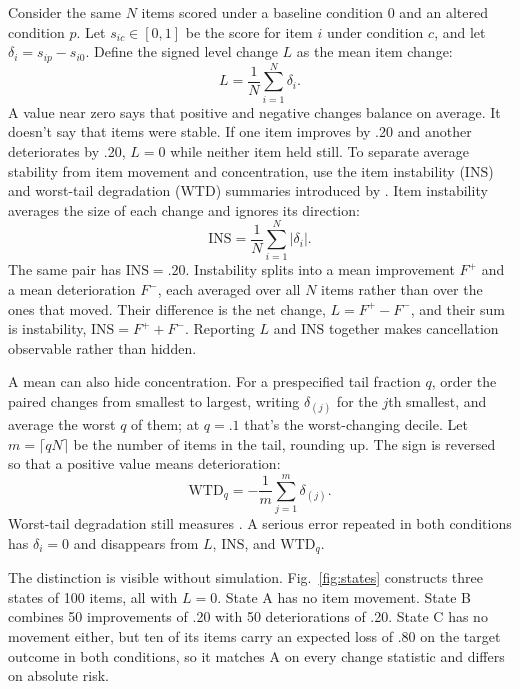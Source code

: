 \documentclass[12pt]{article}
\newcommand{\instab}{\mathrm{INS}}
\newcommand{\wtd}{\mathrm{WTD}}
\begin{document}
Consider the same \(N\) items scored under a baseline condition \(0\) and an altered condition \(p\). Let \(s_{ic}\in[0,1]\) be the score for item \(i\) under condition \(c\), and let \(\delta_i=s_{ip}-s_{i0}\). Define the signed level change \(L\) as the mean item change:
\begin{equation}\label{eq:signed_change}
L=\frac{1}{N}\sum_{i=1}^{N}\delta_i.
\end{equation}
A value near zero says that positive and negative changes balance on average. It doesn't say that items were stable. If one item improves by .20 and another deteriorates by .20, \(L=0\) while neither item held still. To separate average stability from item movement and concentration, use the item instability (\(\instab\)) and worst-tail degradation (\(\wtd\)) summaries introduced by \textcite{zhang2026illusionRobustness}. Item instability averages the size of each change and ignores its direction:
\begin{equation}\label{eq:instability}
\instab=\frac{1}{N}\sum_{i=1}^{N}|\delta_i|.
\end{equation}
The same pair has \(\instab=.20\). Instability splits into a mean improvement \(F^+\) and a mean deterioration \(F^-\), each averaged over all \(N\) items rather than over the ones that moved. Their difference is the net change, \(L=F^+-F^-\), and their sum is instability, \(\instab=F^++F^-\). Reporting \(L\) and \(\instab\) together makes cancellation observable rather than hidden.

A mean can also hide concentration. For a prespecified tail fraction \(q\), order the paired changes from smallest to largest, writing \(\delta_{(j)}\) for the \(j\)th smallest, and average the worst \(q\) of them; at \(q=.1\) that's the worst-changing decile. Let \(m=\lceil qN\rceil\) be the number of items in the tail, rounding up. The sign is reversed so that a positive value means deterioration:
\begin{equation}\label{eq:wtd_main}
\wtd_q=-\frac{1}{m}\sum_{j=1}^{m}\delta_{(j)}.
\end{equation}
Worst-tail degradation still measures . A serious error repeated in both conditions has \(\delta_i=0\) and disappears from \(L\), \(\instab\), and \(\wtd_q\).


The distinction is visible without simulation. Fig.~\ref{fig:states} constructs three states of 100 items, all with \(L=0\). State A has no item movement. State B combines 50 improvements of .20 with 50 deteriorations of .20. State C has no movement either, but ten of its items carry an expected loss of .80 on the target outcome in both conditions, so it matches A on every change statistic and differs on absolute risk.
\end{document}
